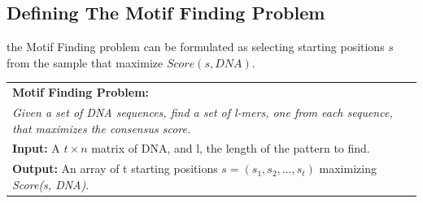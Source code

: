\subsection{Defining The Motif Finding Problem}
the Motif Finding problem can be formulated as selecting starting positions $ s $ from the sample that maximize $ Score(s, DNA) $. 
\begin{table}[H]
	\begin{center}
		\begin{tabular}{p{300 pt}}
			\hline
			\textbf{Motif Finding Problem:}\\
			\textit{Given a set of DNA sequences, find a set of l-mers, one from each
				sequence, that maximizes the consensus score.}\\
			
			\textbf{Input:} A $ t \times n $ matrix of DNA, and l, the length of the pattern
			to find.\\
			
			\textbf{Output:} An array of t starting positions $ s = (s_{1}, s_{2},\dots, s_{t}) $ maximizing \textit{Score(s, DNA)}.\\
			\hline
		\end{tabular}
	\end{center}
\end{table}

\endinput

